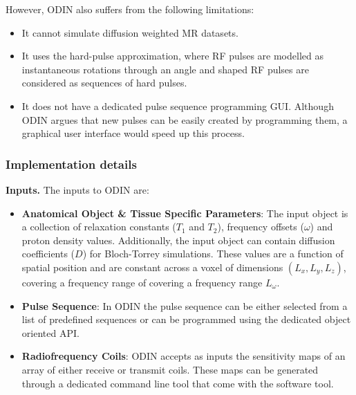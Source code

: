 \hfill

However, ODIN also suffers from the following limitations:
\begin{itemize}
    
    \item It cannot simulate diffusion weighted MR datasets.
    
    \item It uses the hard-pulse approximation, where RF pulses are modelled as instantaneous rotations through an angle and shaped RF pulses are considered as sequences of hard pulses.
    
    \item It does not have a dedicated pulse sequence programming GUI. Although ODIN argues that new pulses can be easily created by programming them, a graphical user interface would speed up this process.
    
\end{itemize}

\hfill

\subsubsection{Implementation details}

\textbf{Inputs.} The inputs to ODIN are:

\begin{itemize}
    
    \item \textbf{Anatomical Object \& Tissue Specific Parameters}: 
    The input object is a collection of relaxation constants ($T_1$ and $T_2$), frequency offsets ($\omega$) and proton density values.
    Additionally, the input object can contain diffusion coefficients ($D$) for Bloch-Torrey simulations.
    These values are a function of spatial position and are constant across a voxel of dimensions $(L_x, L_y, L_z)$, covering a frequency range of covering a frequency range $L_{\omega}$.
    
    \item \textbf{Pulse Sequence}: In ODIN the pulse sequence can be either selected from a list of predefined sequences or can be programmed using the dedicated object oriented API.
    
    \item \textbf{Radiofrequency Coils}: ODIN accepts as inputs the sensitivity maps of an array of either receive or transmit coils.
    These maps can be generated through a dedicated command line tool that come with the software tool.
    
\end{itemize}



